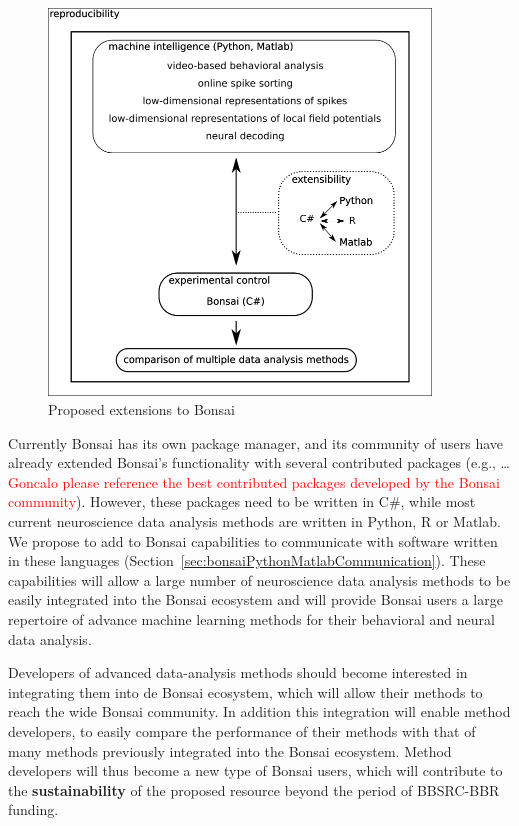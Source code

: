 \documentclass[a4paper,11point]{article}
\begin{document}
\begin{figure}
    \begin{center}
        \includegraphics[width=4in]{figures/proposed_bonsai_extensions.png}
        \caption{Proposed extensions to Bonsai}
        \label{fig:proposedBonsaiExtensions}
    \end{center}
\end{figure}

Currently Bonsai has its own package manager, and its community of users have
already extended Bonsai's functionality with several contributed packages
(e.g., \ldots \textcolor{red}{Goncalo please reference the best contributed
packages developed by the Bonsai community}). However, these packages need to
be written in C\#, while most current neuroscience data analysis methods are
written in Python, R or Matlab. We propose to add to Bonsai capabilities to
communicate with software written in these languages
(Section~\ref{sec:bonsaiPythonMatlabCommunication}).  These capabilities will
allow a large number of neuroscience data analysis methods to be easily
integrated into the Bonsai ecosystem and will provide Bonsai users a large
repertoire of advance machine learning methods for their behavioral and neural
data analysis.

Developers of advanced data-analysis methods should become interested in
integrating them into de Bonsai ecosystem, which will allow their methods to
reach the wide Bonsai community. In addition this integration will enable
method developers, to easily compare the performance of their methods with
that of many methods previously integrated into the Bonsai ecosystem. Method
developers will thus become a new type of Bonsai users, which will contribute
to the \textbf{sustainability} of the proposed resource beyond the period of
BBSRC-BBR funding.
\end{document}
